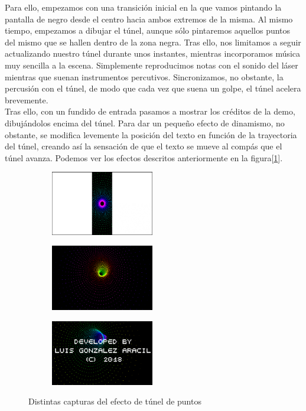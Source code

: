 Para ello, empezamos con una transición inicial en la que vamos pintando la pantalla de negro desde el centro hacia ambos extremos de la misma. Al mismo tiempo, empezamos a dibujar el túnel, aunque sólo pintaremos aquellos puntos del mismo que se hallen dentro de la zona negra. Tras ello, nos limitamos a seguir actualizando nuestro túnel durante unos instantes, mientras incorporamos música muy sencilla a la escena. Simplemente reproducimos notas con el sonido del láser mientras que suenan instrumentos percutivos. Sincronizamos, no obstante, la percusión con el túnel, de modo que cada vez que suena un golpe, el túnel acelera brevemente.\\

Tras ello, con un fundido de entrada pasamos a mostrar los créditos de la demo, dibujándolos encima del túnel. Para dar un pequeño efecto de dinamismo, no obstante, se modifica levemente la posición del texto en función de la trayectoria del túnel, creando así la sensación de que el texto se mueve al compás que el túnel avanza. Podemos ver los efectos descritos anteriormente en la figura[\ref{fig:finaltunel}].\\

\begin{figure}[h]
	\centering
	\begin{subfigure}[b]{0.3\textwidth}
		\centering
		\includegraphics[width=4.5cm]{archivos/tunel1}
	\end{subfigure}
	\begin{subfigure}[b]{0.3\textwidth}
		\centering
		\includegraphics[width=4.5cm]{archivos/tunel2}
	\end{subfigure}
	\begin{subfigure}[b]{0.3\textwidth}
		\centering
		\includegraphics[width=4.5cm]{archivos/tunel3}
	\end{subfigure}
	\caption{Distintas capturas del efecto de túnel de puntos}
	\label{fig:finaltunel}
\end{figure}

